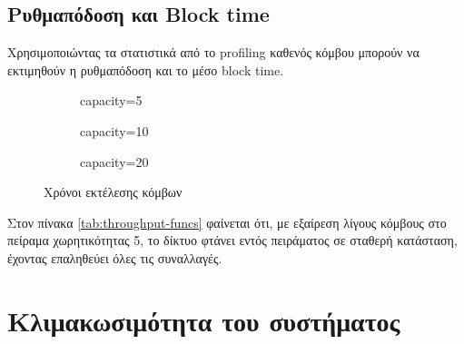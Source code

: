 \documentclass{article}
\newcommand{\eng}[1]{\foreignlanguage{english}{#1}} %
\begin{document}
\subsection{Ρυθμαπόδοση και \eng{Block time}}

Χρησιμοποιώντας τα στατιστικά από το \eng{profiling} καθενός κόμβου
μπορούν να εκτιμηθούν η ρυθμαπόδοση και το μέσο \eng{block time}.

\begin{figure}[ht]
    \begin{subfigure}{\textwidth}
        \centering
        \caption{\eng{capacity=5}}
        \label{fig:throughput-times-5}
        \begin{varwidth}{\linewidth}
            
        \end{varwidth}
    \end{subfigure}
    \begin{subfigure}{\textwidth}
        \centering
        \caption{\eng{capacity=10}}
        \label{fig:throughput-times-10}
        \begin{varwidth}{\linewidth}
            
        \end{varwidth}
    \end{subfigure}
    \begin{subfigure}{\textwidth}
        \centering
        \caption{\eng{capacity=20}}
        \label{fig:throughput-times-20}
        \begin{varwidth}{\linewidth}
            
        \end{varwidth}
    \end{subfigure}
    \caption{Χρόνοι εκτέλεσης κόμβων}
    \label{fig:throughput-times}
\end{figure}
\FloatBarrier

Στον πίνακα \ref{tab:throughput-funcs} φαίνεται ότι, με εξαίρεση λίγους κόμβους
στο πείραμα χωρητικότητας 5, το δίκτυο φτάνει εντός πειράματος σε σταθερή κατάσταση,
έχοντας επαληθεύει όλες τις συναλλαγές.

\clearpage
\section{Κλιμακωσιμότητα του συστήματος}
\end{document}
